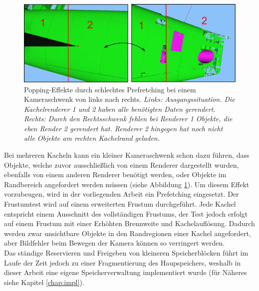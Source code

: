 \begin{figure}
\centering
\includegraphics[scale=0.40]{images/prefetching.pdf}
\caption{\label{fig:basics:prefetching}Popping-Effekte durch schlechtes Prefretching bei einem Kameraschwenk von links nach rechts. \textit{Links: Ausgangssituation. Die Kachelrenderer 1 und 2 haben alle benötigten Daten gerendert. Rechts: Durch den Rechtsschwenk fehlen bei Renderer 1 Objekte, die eben Render 2 gerendert hat. Renderer 2 hingegen hat noch nicht alle Objekte am rechten Kachelrand geladen.}}
\end{figure}
Bei mehreren Kacheln kann ein kleiner Kameraschwenk schon dazu führen, dass Objekte, welche zuvor ausschließlich von einem Renderer dargestellt wurden, ebenfalls von einem anderen Renderer benötigt werden, oder Objekte im Randbereich angefordert werden müssen (siehe Abbildung \ref{fig:basics:prefetching}). Um diesem Effekt vorzubeugen, wird in der vorliegenden Arbeit ein Prefetching eingesetzt. Der Frustumtest wird auf einem erweiterten Frustum durchgeführt. Jede Kachel entspricht einem Ausschnitt des vollständigen Frustums, der Test jedoch erfolgt auf einem Frustum mit einer Erhöhten Brennweite und Kachelauflösung. Dadurch werden zwar unsichtbare Objekte in den Randregionen einer Kachel angefordert, aber Bildfehler beim Bewegen der Kamera können so verringert werden.\\
Das ständige Reservieren und Freigeben von kleineren Speicherblöcken führt im Laufe der Zeit jedoch zu einer Fragmentierung des Haupspeichers, weshalb in dieser Arbeit eine eigene Speicherverwaltung implementiert wurde (für Näheres siehe Kapitel \ref{chap:impl}). 

